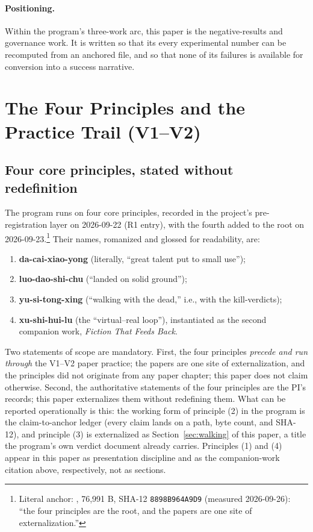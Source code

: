 \documentclass[11pt]{article}
\newcommand{\sha}[1]{\texttt{#1}}
\begin{document}
\paragraph{Positioning.} Within the program's three-work arc, this paper is the negative-results and governance work. It is written so that its every experimental number can be recomputed from an anchored file, and so that none of its failures is available for conversion into a success narrative.

\section{The Four Principles and the Practice Trail (V1--V2)}\label{sec:principles}

\subsection{Four core principles, stated without redefinition}

The program runs on four core principles, recorded in the project's pre-registration layer on 2026-09-22 (R1 entry), with the fourth added to the root on 2026-09-23.\footnote{Literal anchor: , 76{,}991 B, SHA-12 \sha{8898B964A9D9} (measured 2026-09-26): ``the four principles are the root, and the papers are one site of externalization.''} Their names, romanized and glossed for readability, are:

\begin{enumerate}[label=(\arabic*),leftmargin=2em]
\item \textbf{da-cai-xiao-yong} (literally, ``great talent put to small use'');
\item \textbf{luo-dao-shi-chu} (``landed on solid ground'');
\item \textbf{yu-si-tong-xing} (``walking with the dead,'' i.e., with the kill-verdicts);
\item \textbf{xu-shi-hui-lu} (the ``virtual--real loop''), instantiated as the second companion work, \emph{Fiction That Feeds Back}.
\end{enumerate}

Two statements of scope are mandatory. First, the four principles \emph{precede and run through} the V1--V2 paper practice; the papers are one site of externalization, and the principles did not originate from any paper chapter; this paper does not claim otherwise. Second, the authoritative statements of the four principles are the PI's records; this paper externalizes them without redefining them. What can be reported operationally is this: the working form of principle (2) in the program is the claim-to-anchor ledger (every claim lands on a path, byte count, and SHA-12), and principle (3) is externalized as Section~\ref{sec:walking} of this paper, a title the program's own verdict document already carries. Principles (1) and (4) appear in this paper as presentation discipline and as the companion-work citation above, respectively, not as sections.
\end{document}

